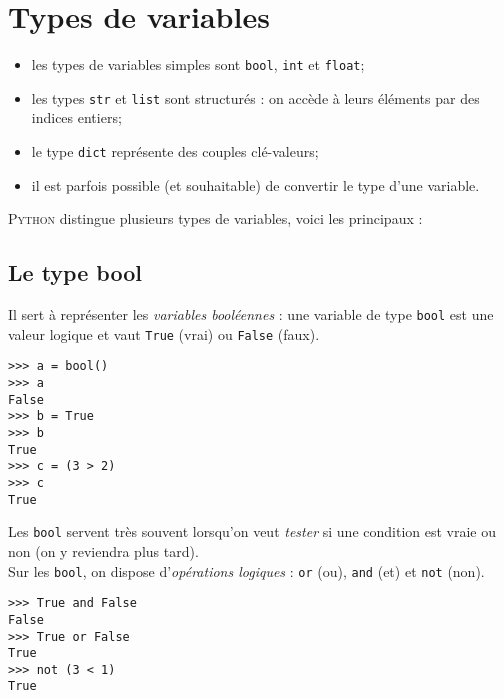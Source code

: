 \chapter{Types de variables}
\label{ch:types}
\begin{aretenir}
    \begin{itemize}
        \item 	les types de variables simples sont \texttt{bool}, \texttt{int} et \texttt{float};
        \item 	les types \texttt{str} et \texttt{list} sont structurés : on accède à leurs éléments par des indices entiers;
        \item 	le type \texttt{dict} représente des couples \og clé-valeurs\fg{};
        \item 	il est parfois possible (et souhaitable) de convertir le type d'une variable.
    \end{itemize}
\end{aretenir}
\textsc{Python} distingue plusieurs types de variables, voici les principaux :
\section{Le type bool}
Il sert à représenter les \textit{variables booléennes} : une variable de type \texttt{bool} est une valeur logique et vaut \texttt{True} (vrai) ou
\texttt{False} (faux).


\begin{pys}\begin{verbatim}
>>> a = bool()
>>> a
False
>>> b = True
>>> b
True
>>> c = (3 > 2)
>>> c
True
\end{verbatim}
\end{pys}

Les \texttt{bool} servent très souvent lorsqu'on veut \textit{tester} si une condition est vraie ou non (on y reviendra plus tard).\\
Sur les \texttt{bool}, on dispose d'\textit{opérations logiques} : \texttt{or} (ou), \texttt{and} (et) et \texttt{not} (non).

\begin{pys}\begin{verbatim}
>>> True and False
False
>>> True or False
True
>>> not (3 < 1)
True
\end{verbatim}
\end{pys}



